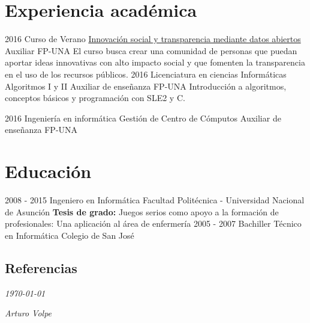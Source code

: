 \documentclass[]{friggeri-cv}
\begin{document}
\section{Experiencia académica}

\clase
    {2016}
    {Curso de Verano}
    {\href{http://www.pol.una.py/cursosverano/index.php?option=com_content&view=article&layout=edit&id=91}{Innovación
            social y transparencia mediante datos abiertos}} 
    {Auxiliar}
    {FP-UNA}
    {El curso busca crear una comunidad de personas que puedan aportar ideas
        innovativas con alto impacto social y que fomenten la transparencia en
        el uso de los recursos públicos. }
\clase
    {2016}
    {Licenciatura en ciencias Informáticas}
    {Algoritmos I y II} 
    {Auxiliar de enseñanza}
    {FP-UNA}
    {Introducción a algoritmos, conceptos básicos y programación con SLE2 y C.}

\clase
    {2016}
    {Ingeniería en informática}
    {Gestión de Centro de Cómputos} 
    {Auxiliar de enseñanza}
    {FP-UNA}
    {}

\newpage
\section{Educación}
\begin{entrylist}
  \educacion
    {2008 - 2015}
    {Ingeniero en Informática}
    {Facultad Politécnica - Universidad Nacional de Asunción}
    {\textbf{Tesis de grado:} Juegos serios como apoyo a la formación de profesionales: Una aplicación al área de enfermería}
  \educacion
    {2005 - 2007}
    {Bachiller Técnico en Informática}
    {Colegio de San José}
    {}
\end{entrylist}

\begin{absolutelynopagebreak}
\section{Referencias}
\begin{entrylist}
\end{entrylist}
\end{absolutelynopagebreak}

\begin{flushleft}
    \emph{\today{}}
\end{flushleft}
\begin{flushright}
    \emph{Arturo Volpe}
\end{flushright}
\end{document}
